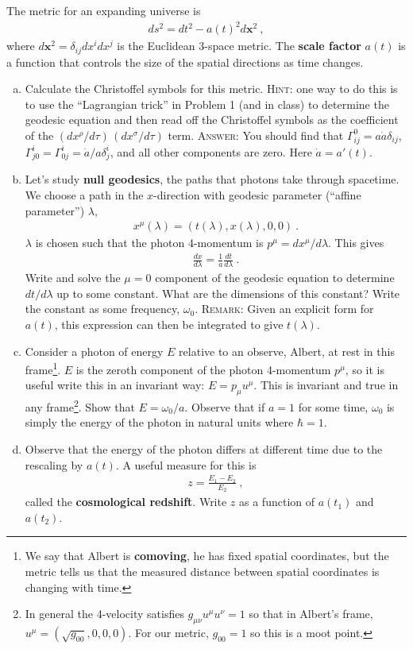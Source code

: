 \documentclass[12pt]{article}
\numberwithin{equation}{section}    %
\renewcommand{\vec}[1]{\mathbf{#1}} %
\begin{document}
The metric for an expanding universe is
\begin{align}
	ds^2 = dt^2 - a(t)^2 d\vec{x}^2 \ ,
\end{align}
where $d\vec{x}^2 = \delta_{ij}dx^i dx^j$ is the Euclidean 3-space metric. The \textbf{scale factor} $a(t)$ is a function that controls the size of the spatial directions as time changes. 
\begin{enumerate}[(a)]
	\item Calculate the Christoffel symbols for this metric. \textsc{Hint}: one way to do this is to use the ``Lagrangian trick'' in Problem 1 (and in class) to determine the geodesic equation and then read off the Christoffel symbols as the coefficient of the $(dx^\rho/d\tau) \, (dx^\sigma/d\tau)$ term.  \textsc{Answer}: You should find that $\Gamma^0_{ij} = a \dot a \delta_{ij}$, $\Gamma^i_{j0} = \Gamma^i_{0j} = \dot a/a \delta^i_j$, and all other components are zero. Here $\dot a = a'(t)$.
	\item Let's study \textbf{null geodesics}, the paths that photons take through spacetime. We choose a path in the $x$-direction with geodesic parameter (``affine parameter'') $\lambda$,
	\begin{align}
		x^\mu(\lambda) = \left(t(\lambda),x(\lambda),0,0\right) \ .
	\end{align}
	$\lambda$ is chosen such that the photon 4-momentum is $p^\mu = dx^\mu/d\lambda$. This gives
	\begin{align}
		\frac{dx}{d\lambda} = \frac{1}{a}\frac{dt}{d\lambda} \ .
	\end{align}
	Write and solve the $\mu = 0$ component of the geodesic equation to determine $dt/d\lambda$ up to some constant. What are the dimensions of this constant? Write the constant as some frequency, $\omega_0$. \textsc{Remark}: Given an explicit form for $a(t)$, this expression can then be integrated to give $t(\lambda)$.
	\item Consider a photon of energy $E$ relative to an observe, Albert, at rest in this frame\footnote{We say that Albert is \textbf{comoving}, he has fixed spatial coordinates, but the metric tells us that the measured distance between spatial coordinates is changing with time.}. $E$ is the zeroth component of the photon 4-momentum $p^\mu$, so it is useful write this in an invariant way: $E = p_\mu u^\mu$. This is invariant and true in any frame\footnote{In general the 4-velocity satisfies $g_{\mu\nu}u^\mu u^\nu = 1$ so that in Albert's frame, 
		$u^\mu = \left(\sqrt{g_00}, 0,0,0\right)$. For our metric, $g_{00} = 1$ so this is a moot point.}. 
		Show that $E = \omega_0/a$. Observe that if $a=1$ for some time, $\omega_0$ is simply the energy of the photon in natural units where $\hbar = 1$. 
	\item Observe that the energy of the photon differs at different time due to the rescaling by $a(t)$. A useful measure for this is
	\begin{align}
		z = \frac{E_1 - E_2}{E_2} \ ,
	\end{align}
	called the \textbf{cosmological redshift}. Write $z$ as a function of $a(t_1)$ and $a(t_2)$. 
\end{enumerate}
\end{document}
